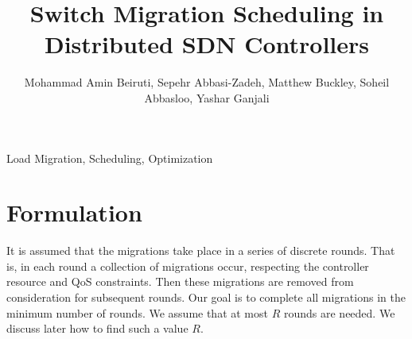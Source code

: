 \documentclass[conference]{IEEEtran}
\begin{document}
\title{Switch Migration Scheduling in Distributed SDN Controllers}

\author{Mohammad Amin Beiruti, Sepehr Abbasi-Zadeh, Matthew Buckley, Soheil Abbasloo, Yashar Ganjali}

\maketitle

\begin{abstract}
\blindtext
\end{abstract}

\begin{IEEEkeywords}
Load Migration, Scheduling, Optimization
\end{IEEEkeywords}

\IEEEpeerreviewmaketitle

\section{Formulation}

\noindent It is assumed that the migrations take place in a series of discrete rounds. That is, in each round a collection of migrations occur, respecting the controller resource and QoS constraints. Then these migrations are removed from consideration for subsequent rounds. Our goal is to complete all migrations in the minimum number of rounds. We assume that at most $R$ rounds are needed. We discuss later how to find such a value $R$.
\end{document}
